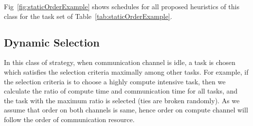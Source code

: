 \documentclass[sigconf]{acmart}
\begin{document}
	
	Fig~\ref{fig:staticOrderExample} shows schedules for all proposed heuristics of this class for the task set of Table~\ref{tab:staticOrderExample}.
	\subsection{Dynamic Selection}
	
	In this class of strategy, when communication channel is idle, a task is chosen which satisfies the selection criteria maximally among other tasks. For example, if the selection criteria is to choose a highly compute intensive task, then  we calculate the ratio of compute time and communication time for all tasks, and the task with the  maximum ratio is selected (ties are broken randomly). As we assume that order on both channels is same, hence order on compute channel will follow the order of communication resource.
	
\end{document}
